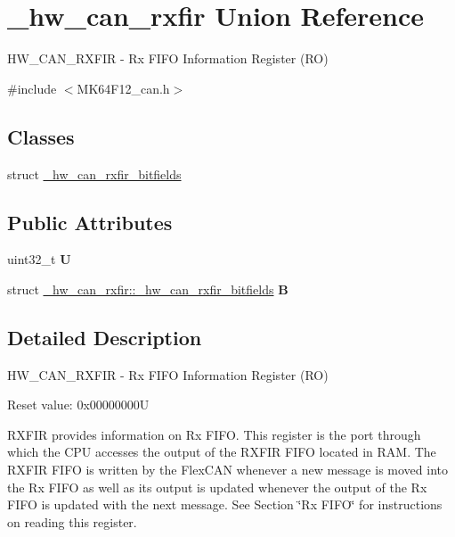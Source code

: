 \hypertarget{union__hw__can__rxfir}{}\section{\+\_\+hw\+\_\+can\+\_\+rxfir Union Reference}
\label{union__hw__can__rxfir}


H\+W\+\_\+\+C\+A\+N\+\_\+\+R\+X\+F\+IR -\/ Rx F\+I\+FO Information Register (RO)  




{\ttfamily \#include $<$M\+K64\+F12\+\_\+can.\+h$>$}

\subsection*{Classes}
\begin{DoxyCompactItemize}
\item 
struct \hyperlink{struct__hw__can__rxfir_1_1__hw__can__rxfir__bitfields}{\+\_\+hw\+\_\+can\+\_\+rxfir\+\_\+bitfields}
\end{DoxyCompactItemize}
\subsection*{Public Attributes}
\begin{DoxyCompactItemize}
\item 
uint32\+\_\+t {\bfseries U}\hypertarget{union__hw__can__rxfir_a6f2f85a7a95124792febd50b69055cc2}{}\label{union__hw__can__rxfir_a6f2f85a7a95124792febd50b69055cc2}

\item 
struct \hyperlink{struct__hw__can__rxfir_1_1__hw__can__rxfir__bitfields}{\+\_\+hw\+\_\+can\+\_\+rxfir\+::\+\_\+hw\+\_\+can\+\_\+rxfir\+\_\+bitfields} {\bfseries B}\hypertarget{union__hw__can__rxfir_a6ea1f681e300e25b632ac6fd58ec318a}{}\label{union__hw__can__rxfir_a6ea1f681e300e25b632ac6fd58ec318a}

\end{DoxyCompactItemize}


\subsection{Detailed Description}
H\+W\+\_\+\+C\+A\+N\+\_\+\+R\+X\+F\+IR -\/ Rx F\+I\+FO Information Register (RO) 

Reset value\+: 0x00000000U

R\+X\+F\+IR provides information on Rx F\+I\+FO. This register is the port through which the C\+PU accesses the output of the R\+X\+F\+IR F\+I\+FO located in R\+AM. The R\+X\+F\+IR F\+I\+FO is written by the Flex\+C\+AN whenever a new message is moved into the Rx F\+I\+FO as well as its output is updated whenever the output of the Rx F\+I\+FO is updated with the next message. See Section \char`\"{}\+Rx F\+I\+F\+O\char`\"{} for instructions on reading this register. 


